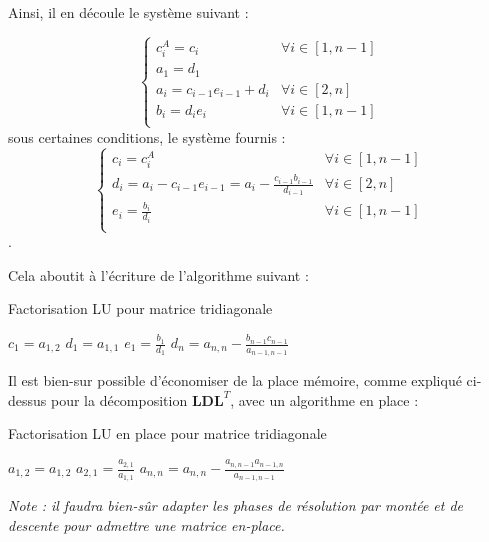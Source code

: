 \documentclass[12pt]{report}
\begin{document}
Ainsi, il en découle le système suivant :

\begin{equation} \left\{
\begin{array}{ll}
c_{i}^A = c_i &\forall i \in [1, n-1] \\
a_1 = d_1 & \\
a_{i} = c_{i-1} e_{i-1} + d_i&\forall i \in [2, n]\\
b_i = d_i e_i&\forall i \in [1, n-1]\\
\end{array}
\right.
\end{equation}
sous certaines conditions, le système fournis :
\begin{equation} \left\{
\begin{array}{ll}
c_{i} = c_i^A &\forall i \in [1, n-1] \\
d_{i} = a_i - c_{i-1} e_{i-1} = a_i - \frac{c_{i-1} b_{i-1}}{d_{i-1}}&\forall i \in [2, n]\\
e_i = \frac{b_i}{d_i}&\forall i \in [1, n-1]\\
\end{array}
\right.
\end{equation}.

Cela aboutit à l'écriture de l'algorithme suivant :

\begin{algorithm}[H]
\caption{Factorisation LU pour matrice tridiagonale}\label{alg:two}
$c_1 = a_{1,2}$ \;
$d_1 = a_{1,1}$ \;
$e_1 = \frac{b_1}{d_1}$ \;
$d_n =  a_{n,n} - \frac{b_{n-1} c_{n-1}}{a_{n-1,n-1}}$\;
\end{algorithm}

Il est bien-sur possible d'économiser de la place mémoire, comme expliqué ci-dessus pour la décomposition $\mathbf{L}\mathbf{D} \mathbf{L}^T$, avec un algorithme en place : 

\begin{algorithm}[H]
\caption{Factorisation LU en place pour matrice tridiagonale}\label{alg:two}
$a_{1,2} = a_{1,2}$ \;
$a_{2,1} = \frac{a_{2,1}}{a_{1,1}}$ \;
$a_{n,n} =  a_{n,n} - \frac{a_{n, n-1} a_{n-1, n}}{a_{n-1,n-1}}$\;
\end{algorithm}

\textit{Note : il faudra bien-sûr adapter les phases de résolution par montée et de descente pour admettre une matrice en-place.}
\end{document}
